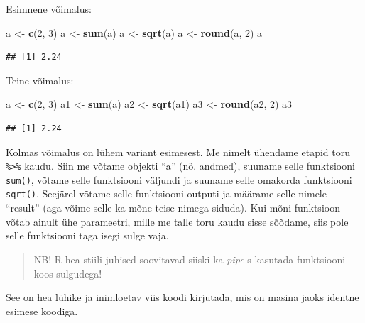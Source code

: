\documentclass[]{book}
\newenvironment{Shaded}{\begin{snugshade}}{\end{snugshade}}
\newcommand{\KeywordTok}[1]{\textcolor[rgb]{0.13,0.29,0.53}{\textbf{#1}}}
\newcommand{\DecValTok}[1]{\textcolor[rgb]{0.00,0.00,0.81}{#1}}
\newcommand{\StringTok}[1]{\textcolor[rgb]{0.31,0.60,0.02}{#1}}
\newcommand{\NormalTok}[1]{#1}
\begin{document}
Esimnene võimalus:

\begin{Shaded}
\begin{Highlighting}[]
\NormalTok{a <-}\StringTok{ }\KeywordTok{c}\NormalTok{(}\DecValTok{2}\NormalTok{, }\DecValTok{3}\NormalTok{)}
\NormalTok{a <-}\StringTok{ }\KeywordTok{sum}\NormalTok{(a)}
\NormalTok{a <-}\StringTok{ }\KeywordTok{sqrt}\NormalTok{(a)}
\NormalTok{a <-}\StringTok{ }\KeywordTok{round}\NormalTok{(a, }\DecValTok{2}\NormalTok{)}
\NormalTok{a}
\end{Highlighting}
\end{Shaded}

\begin{verbatim}
## [1] 2.24
\end{verbatim}

Teine võimalus:

\begin{Shaded}
\begin{Highlighting}[]
\NormalTok{a <-}\StringTok{ }\KeywordTok{c}\NormalTok{(}\DecValTok{2}\NormalTok{, }\DecValTok{3}\NormalTok{)}
\NormalTok{a1 <-}\StringTok{ }\KeywordTok{sum}\NormalTok{(a)}
\NormalTok{a2 <-}\StringTok{ }\KeywordTok{sqrt}\NormalTok{(a1)}
\NormalTok{a3 <-}\StringTok{ }\KeywordTok{round}\NormalTok{(a2, }\DecValTok{2}\NormalTok{)}
\NormalTok{a3}
\end{Highlighting}
\end{Shaded}

\begin{verbatim}
## [1] 2.24
\end{verbatim}

Kolmas võimalus on lühem variant esimesest. Me nimelt ühendame etapid
toru \texttt{\%\textgreater{}\%} kaudu. Siin me võtame objekti ``a''
(nö. andmed), suuname selle funktsiooni \texttt{sum()}, võtame selle
funktsiooni väljundi ja suuname selle omakorda funktsiooni
\texttt{sqrt()}. Seejärel võtame selle funktsiooni outputi ja määrame
selle nimele ``result'' (aga võime selle ka mõne teise nimega siduda).
Kui mõni funktsioon võtab ainult ühe parameetri, mille me talle toru
kaudu sisse sõõdame, siis pole selle funktsiooni taga isegi sulge vaja.

\begin{quote}
NB! R hea stiili juhised soovitavad siiski ka \emph{pipe}-s kasutada
funktsiooni koos sulgudega!
\end{quote}

See on hea lühike ja inimloetav viis koodi kirjutada, mis on masina
jaoks identne esimese koodiga.
\end{document}
